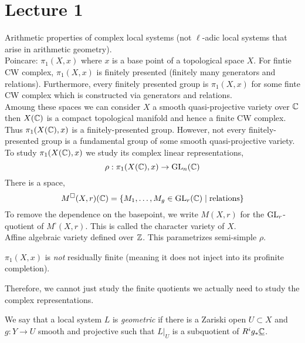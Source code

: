 \documentclass[12pt]{article}
\begin{document}
\section{Lecture 1}

\newcommand{\Msq}{M^{\square}}

Arithmetic properties of complex local systems (not $\ell$-adic local systems that arise in arithmetic geometry).
\bigskip\\
Poincare: $\pi_1(X, x)$ where $x$ is a base point of a topological space $X$. For fintie CW complex, $\pi_1(X, x)$ is finitely presented (finitely many generators and relations). Furthermore, every finitely presented group is $\pi_1(X, x)$ for some finte CW complex which is constructed via generators and relations. 
\bigskip\\
Amoung these spaces we can consider $X$ a smooth quasi-projective variety over $\mathbb{C}$ then $X(\mathbb{C})$ is a compact topological manifold and hence a finite CW complex. Thus $\pi_1(X(\mathbb{C}), x)$ is a finitely-presented group. However, not every finitely-presented group is a fundamental group of some smooth quasi-projective variety. 
\bigskip\\
To study $\pi_1(X(\mathbb{C}), x)$ we study its complex linear representations,
\[ \rho : \pi_1(X(\mathbb{C}), x) \to \mathrm{GL}_n(\mathbb{C}) \]
There is a space,
\[ \Msq(X, r)(\CC) = \{ M_1, \dots, M_g \in \GL_r(\CC) \mid \text{relations} \} \]
To remove the dependence on the basepoint, we write $M(X, r)$ for the $\mathrm{GL}_r$-quotient of $\Msq(X, r)$. This is called the character variety of $X$. 
\bigskip\\
Affine algebraic variety defined over $\mathbb{Z}$. This parametrizes semi-simple $\rho$.

\begin{theorem}[Toledo]
$\pi_1(X, x)$ is \textit{not} residually finite (meaning it does not inject into its profinite completion). 
\end{theorem}

\begin{rmk}
Therefore, we cannot just study the finite quotients we actually need to study the complex representations. 
\end{rmk}

\begin{defn}
We say that a local system $L$ is \textit{geometric} if there is a Zariski open $U \subset X$ and $g : Y \to U$ smooth and projective such that $L|_U$ is a subquotient of $R^i g_* \underline{\mathbb{C}}$.
\end{defn}
\end{document}

